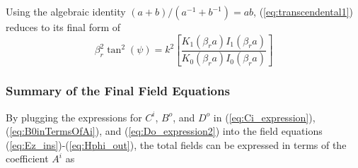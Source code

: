 Using the algebraic identity $(a+b)/(a^{-1}+b^{-1})=ab$, (\ref{eq:transcendental1}) reduces to its final form of  
\begin{equation}
		\beta_r^2 \tan^2\left(\psi\right) = k^2 \left[ \frac{K_1(\beta_r a)I_1(\beta_r a)}{K_0(\beta_r a)I_0(\beta_r a)}\right]
	\label{eq:transcendental2}
\end{equation}

\subsubsection{Summary of the Final Field Equations}\label{subsubsec:summary}
By plugging the expressions for $C^i$, $B^o$, and $D^o$ in (\ref{eq:Ci_expression}), (\ref{eq:B0inTermsOfAi}), and (\ref{eq:Do_expression2}) into the field equations (\ref{eq:Ez_ins})-(\ref{eq:Hphi_out}), the total fields can be expressed in terms of the coefficient $A^i$ as 

